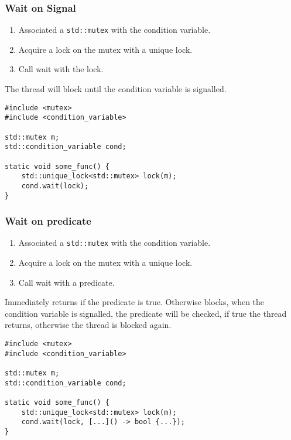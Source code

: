 \begin{minipage}{.48\textwidth}
	\subsubsection{Wait on Signal}
	\begin{enumerate}
		\item Associated a \texttt{std::mutex} with the condition variable.
		\item Acquire a lock on the mutex with a unique lock.
		\item Call wait with the lock.
	\end{enumerate}
	The thread will block until the condition variable is signalled.
	\begin{verbatim}
#include <mutex>
#include <condition_variable>

std::mutex m;
std::condition_variable cond;

static void some_func() {
    std::unique_lock<std::mutex> lock(m);
    cond.wait(lock);
}
  \end{verbatim}
\end{minipage}
\hfill
\vline
\hfill
\begin{minipage}{.48\textwidth}
	\subsubsection{Wait on predicate}
	\begin{enumerate}
		\item Associated a \texttt{std::mutex} with the condition variable.
		\item Acquire a lock on the mutex with a unique lock.
		\item Call wait with a predicate.
	\end{enumerate}
	Immediately returns if the predicate is true. Otherwise blocks, when the condition variable is
	signalled, the predicate will be checked, if true the thread returns, otherwise the thread
	is blocked again.
	\begin{verbatim}
#include <mutex>
#include <condition_variable>

std::mutex m;
std::condition_variable cond;

static void some_func() {
    std::unique_lock<std::mutex> lock(m);
    cond.wait(lock, [...]() -> bool {...});
}
  \end{verbatim}
\end{minipage}


